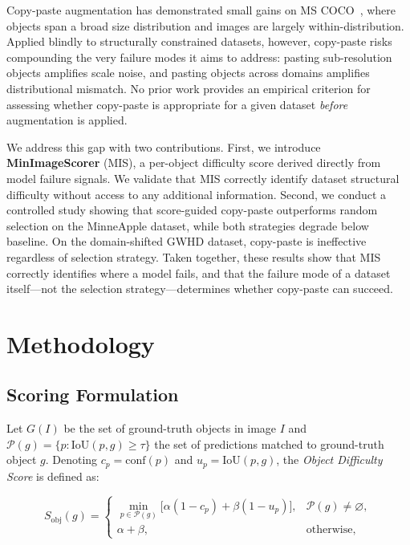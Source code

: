 \documentclass[conference]{IEEEtran}
\begin{document}
Copy-paste augmentation has demonstrated small gains on MS
COCO~\cite{kisantal2019augmentation, ghiasi2021simple}, where
objects span a broad size distribution and images are largely
within-distribution.
Applied blindly to structurally constrained datasets, however,
copy-paste risks compounding the very failure modes it aims to
address: pasting sub-resolution objects amplifies scale noise,
and pasting objects across domains amplifies distributional
mismatch.
No prior work provides an empirical criterion for assessing whether
copy-paste is appropriate for a given dataset \emph{before}
augmentation is applied.

We address this gap with two contributions.
First, we introduce \textbf{MinImageScorer} (MIS), a per-object
difficulty score derived directly from model failure signals.
We validate that MIS correctly identify dataset structural difficulty
without access to any additional information.
Second, we conduct a controlled study showing that score-guided
copy-paste outperforms random selection on the 
MinneApple dataset, while both strategies degrade below baseline. 
On the domain-shifted GWHD dataset, copy-paste
is ineffective regardless of selection strategy.
Taken together, these results show that MIS correctly identifies
where a model fails, and that the failure mode of a dataset itself---not the
selection strategy---determines whether copy-paste can succeed.

\section{Methodology}

\subsection{Scoring Formulation}

Let $G(I)$ be the set of ground-truth objects in image $I$ and
$\mathcal{P}(g) = \{p : \mathrm{IoU}(p,g) \ge \tau\}$
the set of predictions matched to ground-truth object $g$.
Denoting $c_p = \mathrm{conf}(p)$ and $u_p = \mathrm{IoU}(p,g)$,
the \emph{Object Difficulty Score} is defined as:

\begin{equation}
S_{\mathrm{obj}}(g) =
\begin{cases}
  \min_{p \in \mathcal{P}(g)}
    \bigl[\alpha(1{-}c_p) + \beta(1{-}u_p)\bigr],
    & \mathcal{P}(g) \neq \varnothing, \\[3pt]
  \alpha + \beta, & \text{otherwise,}
\end{cases}
\label{eq:obj}
\end{equation}
\end{document}
